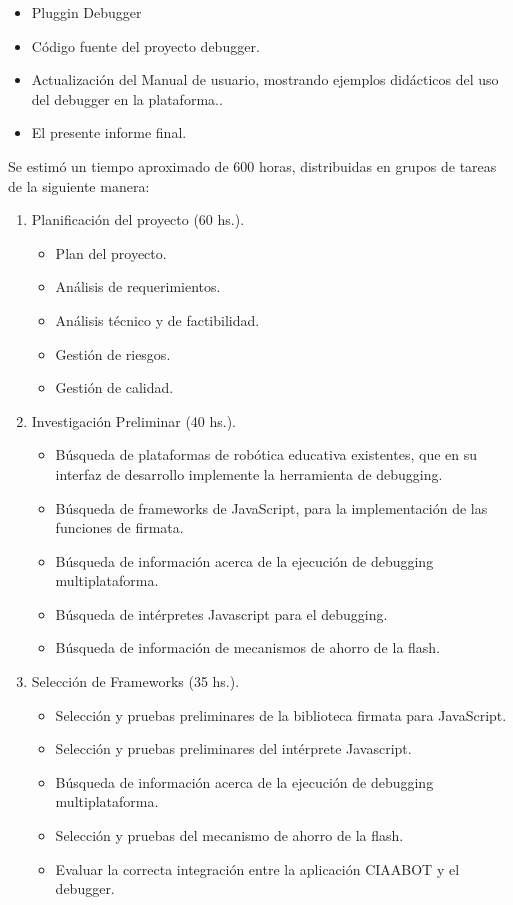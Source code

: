 \begin{itemize}
	\item Pluggin Debugger	
	\item Código fuente del proyecto debugger.
	\item Actualización del Manual de usuario, mostrando ejemplos didácticos del uso del debugger en la plataforma..
	\item El presente informe final.
\end{itemize}

Se estimó un tiempo aproximado de 600 horas, distribuidas en grupos de tareas de
la siguiente manera:

\begin{enumerate}
	\item Planificación del proyecto (60 hs.).
	
	\begin{itemize}
		\item Plan del proyecto.
		\item Análisis de requerimientos.
		\item Análisis técnico y de factibilidad.
		\item Gestión de riesgos.
		\item Gestión de calidad.
	\end{itemize}

	\item Investigación Preliminar (40 hs.).
	
	\begin{itemize}
		\item Búsqueda de plataformas de robótica educativa existentes, que en su interfaz de desarrollo implemente la herramienta de debugging.
		\item Búsqueda de frameworks de JavaScript, para la implementación de las funciones de firmata.
		\item Búsqueda de información acerca de la ejecución de debugging multiplataforma.
		\item Búsqueda de intérpretes Javascript para el debugging.
		\item Búsqueda de información de mecanismos de ahorro de la flash.
	\end{itemize}

	\item Selección de Frameworks (35 hs.).
	
	\begin{itemize}
		\item Selección y pruebas preliminares de la biblioteca firmata para JavaScript.
		\item Selección y pruebas preliminares del intérprete Javascript.
		\item Búsqueda de información acerca de la ejecución de debugging multiplataforma.
		\item Selección y pruebas del mecanismo de ahorro de la flash.
		\item Evaluar la correcta integración entre la aplicación CIAABOT y el debugger.
	\end{itemize}
	

\end{enumerate}
